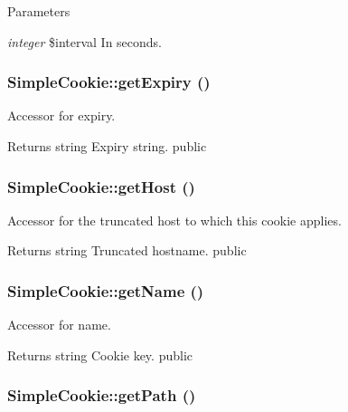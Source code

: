 \begin{DoxyParams}{Parameters}
\item[{\em integer}]\$interval In seconds. \end{DoxyParams}
\hypertarget{class_simple_cookie_a076ae02773a20d34858bb34c628729bd}{
\subsubsection[{getExpiry}]{\setlength{\rightskip}{0pt plus 5cm}SimpleCookie::getExpiry ()}}
\label{class_simple_cookie_a076ae02773a20d34858bb34c628729bd}
Accessor for expiry. \begin{DoxyReturn}{Returns}
string Expiry string.  public 
\end{DoxyReturn}
\hypertarget{class_simple_cookie_a8139a318602091eacb73d2051324fe7b}{
\subsubsection[{getHost}]{\setlength{\rightskip}{0pt plus 5cm}SimpleCookie::getHost ()}}
\label{class_simple_cookie_a8139a318602091eacb73d2051324fe7b}
Accessor for the truncated host to which this cookie applies. \begin{DoxyReturn}{Returns}
string Truncated hostname.  public 
\end{DoxyReturn}
\hypertarget{class_simple_cookie_a45fba343cdf668ddd956b76ef79f8d58}{
\subsubsection[{getName}]{\setlength{\rightskip}{0pt plus 5cm}SimpleCookie::getName ()}}
\label{class_simple_cookie_a45fba343cdf668ddd956b76ef79f8d58}
Accessor for name. \begin{DoxyReturn}{Returns}
string Cookie key.  public 
\end{DoxyReturn}
\hypertarget{class_simple_cookie_a6b0897c1051d8ff8fa7f3b8e0c70d0ed}{
\subsubsection[{getPath}]{\setlength{\rightskip}{0pt plus 5cm}SimpleCookie::getPath ()}}
